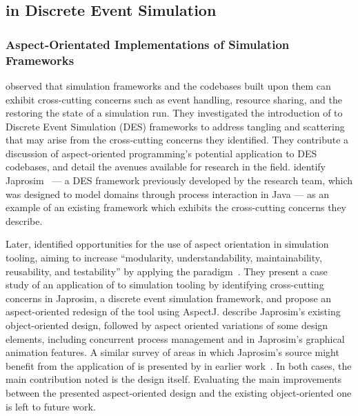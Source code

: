 \subsection{\AspectOrientation{} in Discrete Event Simulation}

\subsubsection{Aspect-Orientated Implementations of Simulation Frameworks}

\citet{chibani2013toward} observed that simulation frameworks and the codebases
built upon them can exhibit cross-cutting concerns such as event handling,
resource sharing, and the restoring the state of a simulation run. They
investigated the introduction of \aspectorientation{} to Discrete Event Simulation
(DES) frameworks to address tangling and scattering that may arise from the
cross-cutting concerns they identified. They contribute a discussion of
aspect-oriented programming's potential application to DES codebases, and detail
the avenues available for research in the field. \citet{chibani2013toward}
identify Japrosim~\cite{abdelhabib2008japrosim,belattar2014yet} --- a DES
framework previously developed by the research team, which was designed to model
domains through process interaction in Java --- as an example of an
existing framework which exhibits the cross-cutting concerns they describe.

Later, \citet{chibani2019using} identified opportunities for the use of aspect
orientation in simulation tooling, aiming to increase ``modularity,
understandability, maintainability, reusability, and testability'' by applying
the paradigm~\cite{chibani2019using}. They present a case study of an
application of \aspectorientation{} to simulation tooling by identifying
cross-cutting concerns in Japrosim, a discrete event simulation framework, and
propose an aspect-oriented redesign of the tool using AspectJ.
\citeauthor{chibani2019using} describe Japrosim's existing object-oriented
design, followed by aspect oriented variations of some design elements,
including concurrent process management and in Japrosim's graphical animation
features. A similar survey of areas in which Japrosim's source might benefit
from the application of \aspectorientation{} is presented by
\citeauthor{chibani2014practical} in earlier work~\cite{chibani2014practical}.
In both cases, the main contribution noted is the design itself. Evaluating the
main improvements between the presented aspect-oriented design and the existing
object-oriented one is left to future work.


